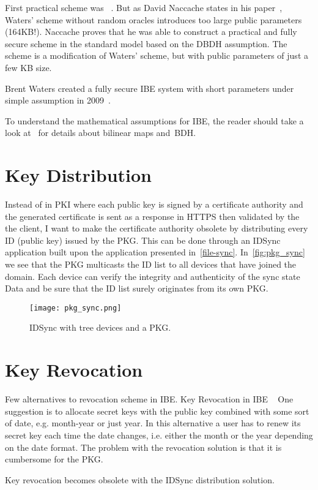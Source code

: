 First practical scheme was ~\cite{DBLP:journals/iacr/Waters04}.
But as David Naccache states in his paper~\cite{DBLP:journals/iacr/Naccache05}, Waters' scheme without random oracles introduces too large public parameters (164\gls{KB}!).
Naccache proves that he was able to construct a practical and fully secure scheme in the standard model based on the \gls{DBDH} assumption.
The scheme is a modification of Waters' scheme, but with public parameters of just a few \gls{KB} size.

Brent Waters created a fully secure \gls{IBE} system with short parameters under simple assumption in 2009~\cite{DBLP:conf/crypto/Waters09}.

To understand the mathematical assumptions for \gls{IBE}, the reader should take a look at~\cite[section 3]{DBLP:conf/crypto/BonehF01} for details about bilinear maps and~\gls{BDH}.

\section{Key Distribution}
Instead of in \gls{PKI} where each public key is signed by a certificate authority and the generated certificate is sent as a response in \gls{HTTPS} then validated by the the client, I want to make the certificate authority obsolete by distributing every \gls{ID} (public key) issued by the \gls{PKG}.
This can be done through an IDSync application built upon the application presented in~\autoref{file-sync}.
In~\autoref{fig:pkg_sync} we see that the \gls{PKG} multicasts the \gls{ID} list to all devices that have joined the domain.
Each device can verify the integrity and authenticity of the sync state Data and be sure that the \gls{ID} list surely originates from its own \gls{PKG}.
\begin{figure}[ht]
  \centering
  \texttt{[image: pkg\_sync.png]}
  \caption{IDSync with tree devices and a PKG.}
  \label{fig:pkg_sync}
\end{figure}

\section{Key Revocation}
Few alternatives to revocation scheme in \gls{IBE}.
Key Revocation in IBE ~\cite{DBLP:journals/iacr/BoldyrevaGK12} 
One suggestion is to allocate secret keys with the public key combined with some sort of date, e.g. month-year or just year. 
In this alternative a user has to renew its secret key each time the date changes, i.e. either the month or the year depending on the date format.
The problem with the revocation solution is that it is cumbersome for the \gls{PKG}.


Key revocation becomes obsolete with the IDSync distribution solution. 
